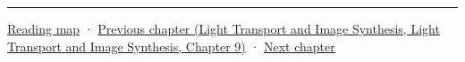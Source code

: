 \begin{center}\rule{0.5\linewidth}{0.5pt}\end{center}

\hyperref[volume-reading-map]{Reading map} · \href{../04-Light-Transport-and-Image-Synthesis/main.pdf\#nameddest=04-visual-computing-ii-ch035-a-complete-renderer-as-an-executable-forward-model}{Previous chapter (Light Transport and Image Synthesis, Light Transport and Image Synthesis, Chapter 9)} · \hyperref[04-visual-computing-ii-ch037-gaussian-splatting-and-editable-captured-worlds]{Next chapter}
